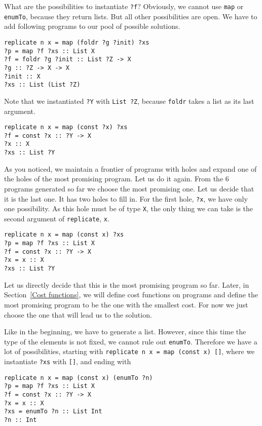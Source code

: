 What are the possibilities to instantiate \lstinline!?f!? Obviously, we cannot use \lstinline?map? or \lstinline?enumTo?, because they return lists. But all other possibilities are open. We have to add following programs to our pool of possible solutions.

\begin{lstlisting}[style=plain]
replicate n x = map (foldr ?g ?init) ?xs
?p = map ?f ?xs :: List X
?f = foldr ?g ?init :: List ?Z -> X
?g :: ?Z -> X -> X
?init :: X
?xs :: List (List ?Z)
\end{lstlisting}
Note that we instantiated \lstinline!?Y! with \lstinline!List ?Z!, because \lstinline?foldr? takes a list as its last argument.

\begin{lstlisting}[style=plain]
replicate n x = map (const ?x) ?xs
?f = const ?x :: ?Y -> X
?x :: X
?xs :: List ?Y
\end{lstlisting}

As you noticed, we maintain a frontier of programs with holes and expand one of the holes of the most promising program. Let us do it again. From the $6$ programs generated so far we choose the most promising one. Let us decide that it is the last one.
It has two holes to fill in. For the first hole, \lstinline!?x!, we have only one possibility. As this hole must be of type \lstinline?X?, the only thing we can take is the second argument of \lstinline?replicate?, \lstinline?x?.

\begin{lstlisting}[style=plain]
replicate n x = map (const x) ?xs
?p = map ?f ?xs :: List X
?f = const ?x :: ?Y -> X
?x = x :: X
?xs :: List ?Y
\end{lstlisting}

Let us directly decide that this is the most promising program so far. Later, in Section~\ref{Cost functions}, we will define cost functions on programs and define the most promising program to be the one with the smallest cost. For now we just choose the one that will lead us to the solution.

Like in the beginning, we have to generate a list. However, since this time the type of the elements is not fixed, we cannot rule out  \lstinline?enumTo?.
Therefore we have a lot of possibilities, starting with \lstinline?replicate n x = map (const x) []?, where we instantiate \lstinline!?xs! with \lstinline?[]?, and ending with

\begin{lstlisting}[style=plain]
replicate n x = map (const x) (enumTo ?n)
?p = map ?f ?xs :: List X
?f = const ?x :: ?Y -> X
?x = x :: X
?xs = enumTo ?n :: List Int
?n :: Int
\end{lstlisting}

